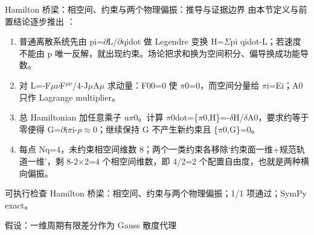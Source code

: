 \begin{frame}[t]{Hamilton 桥梁：相空间、约束与两个物理偏振：推导与证据边界}
\footnotesize
{}\quad 由本节定义与前置结论逐步推出 ：
\begin{enumerate}
\item 普通离散系统先由 pi=\ensuremath{\partial}L/\allowbreak{}\ensuremath{\partial}qidot 做 Legendre 变换 H=\ensuremath{\Sigma}pi qidot-L；若速度不能由 p 唯一反解，就出现约束。场论把求和换为空间积分、偏导换成功能导数。
\item 对 L=-F\ensuremath{\mu}\ensuremath{\nu}F\ensuremath{^{\mu\nu}}/\allowbreak{}4-J\ensuremath{\mu}A\ensuremath{\mu} 求动量：F00=0 使 \ensuremath{\pi}0=0，而空间分量给 \ensuremath{\pi}i=Ei；A0 只作 Lagrange multiplier。
\item 总 Hamiltonian 加任意乘子 u\ensuremath{\pi}0。计算 \ensuremath{\pi}0dot=\{\ensuremath{\pi}0,H\}=-\ensuremath{\delta}H/\allowbreak{}\ensuremath{\delta}A0，要求约等于零便得 G=\ensuremath{\partial}i\ensuremath{\pi}i-\ensuremath{\rho}\ensuremath{\approx}0；继续保持 G 不产生新约束且 \{\ensuremath{\pi}0,G\}=0。
\item 每点 Nq=4，未约束相空间维数 8；两个一类约束各移除‘约束面一维+规范轨道一维’，剩 8-2\ensuremath{\times}2=4 个相空间维数，即 4/\allowbreak{}2=2 个配置自由度，也就是两种横向偏振。
\end{enumerate}\begin{block}{可执行检查}
\quad Hamilton 桥梁：相空间、约束与两个物理偏振；1/1 项通过；SymPy exact。
\par\scriptsize 假设：一维周期有限差分作为 Gauss 散度代理
\end{block}
\end{frame}

